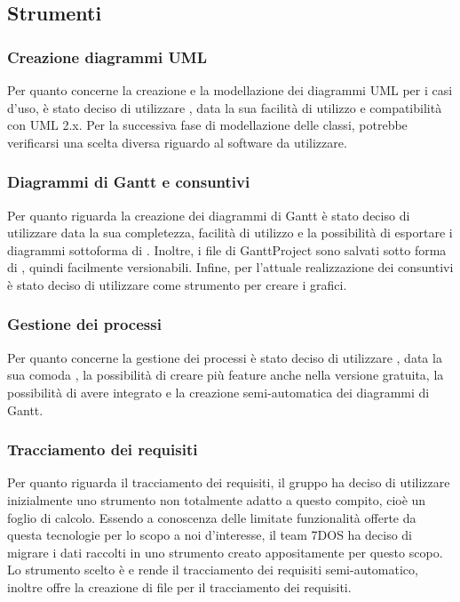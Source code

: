 \subsection{Strumenti}
\subsubsection{Creazione diagrammi UML}
Per quanto concerne la creazione e la modellazione dei diagrammi UML per i casi d'uso, è stato deciso di utilizzare , data la sua facilità di utilizzo e compatibilità con UML 2.x. Per la successiva fase di modellazione delle classi, potrebbe verificarsi una scelta diversa riguardo al software da utilizzare.
\subsubsection{Diagrammi di Gantt e consuntivi}
Per quanto riguarda la creazione dei diagrammi di Gantt è stato deciso di utilizzare  data la sua completezza, facilità di utilizzo e la possibilità di esportare i diagrammi sottoforma di . Inoltre, i file  di GanttProject sono salvati sotto forma di , quindi facilmente versionabili.
Infine, per l'attuale realizzazione dei consuntivi è stato deciso di utilizzare  come strumento per creare i grafici.
\subsubsection{Gestione dei processi}
Per quanto concerne la gestione dei processi è stato deciso di utilizzare , data la sua comoda , la possibilità di creare più feature anche nella versione gratuita, la possibilità di avere  integrato e la creazione semi-automatica dei diagrammi di Gantt.
\subsubsection{Tracciamento dei requisiti}
Per quanto riguarda il tracciamento dei requisiti, il gruppo ha deciso di utilizzare inizialmente uno strumento non totalmente adatto a questo compito, cioè un foglio di calcolo. Essendo a conoscenza delle limitate funzionalità offerte da questa tecnologie per lo scopo a noi d'interesse, il team 7DOS ha deciso di migrare i dati raccolti in uno strumento creato appositamente per questo scopo. Lo strumento scelto è  e rende il tracciamento dei requisiti semi-automatico, inoltre offre la creazione di file  per il tracciamento dei requisiti.
\pagebreak
